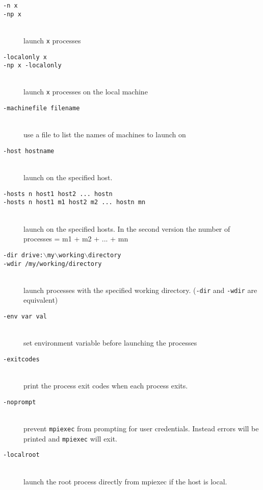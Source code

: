 \documentclass[dvipdfm,11pt]{article}
\begin{document}
\begin{description}
\item[\texttt{-n x}]
\item[\texttt{-np x}]\mbox{}\\
  launch \texttt{x} processes
\item[\texttt{-localonly x}]
\item[\texttt{-np x -localonly}]\mbox{}\\
  launch \texttt{x} processes on the local machine
\item[\texttt{-machinefile filename}]\mbox{}\\
  use a file to list the names of machines to launch on
\item[\texttt{-host hostname}]\mbox{}\\
  launch on the specified host.
\item[\texttt{-hosts n host1 host2 ... hostn}]
\item[\texttt{-hosts n host1 m1 host2 m2 ... hostn mn}]\mbox{}\\
  launch on the specified hosts.
  In the second version the number of processes = m1 + m2 + ... + mn
\item[\texttt{-dir drive:$\backslash$my$\backslash$working$\backslash$directory}]
\item[\texttt{-wdir /my/working/directory}]\mbox{}\\
  launch processes with the specified working directory. (\texttt{-dir}
  and \texttt{-wdir} are equivalent)
\item[\texttt{-env var val}]\mbox{}\\
  set environment variable before launching the processes
\item[\texttt{-exitcodes}]\mbox{}\\
  print the process exit codes when each process exits.
\item[\texttt{-noprompt}]\mbox{}\\
  prevent \texttt{mpiexec} from prompting for user credentials.  Instead errors will
be printed and \texttt{mpiexec} will exit.
\item[\texttt{-localroot}]\mbox{}\\
  launch the root process directly from mpiexec if the host is local.

\end{description}
\end{document}
